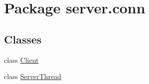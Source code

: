 \hypertarget{namespaceserver_1_1conn}{}\section{Package server.\+conn}
\label{namespaceserver_1_1conn}
\subsection*{Classes}
\begin{DoxyCompactItemize}
\item 
class \hyperlink{classserver_1_1conn_1_1_client}{Client}
\item 
class \hyperlink{classserver_1_1conn_1_1_server_thread}{Server\+Thread}
\end{DoxyCompactItemize}
